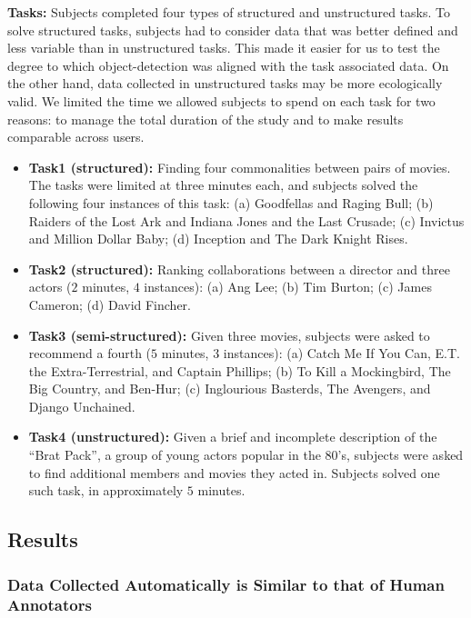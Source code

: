 \noindent\textbf{Tasks:} Subjects completed four types of structured and unstructured tasks. To solve structured tasks, subjects had to consider data that was better defined and less variable than in unstructured tasks. This made it easier for us to test the degree to which object-detection was aligned with the task associated data. On the other hand, data collected in unstructured tasks may be more ecologically valid. We limited the time we allowed subjects to spend on each task for two reasons: to manage the total duration of the study and to make results comparable across users.

\begin{itemize}
\item \textbf{Task1 (structured):} Finding four commonalities between pairs of movies. The tasks were limited at three minutes each, and subjects solved the following four instances of this task: (a) Goodfellas and Raging Bull; (b) Raiders of the Lost Ark and Indiana Jones and the Last Crusade; (c) Invictus and Million Dollar Baby; (d) Inception and The Dark Knight Rises.  
\item \textbf{Task2 (structured):} Ranking collaborations between a director and three actors ($2$ minutes, $4$ instances): (a) Ang Lee; (b) Tim Burton; (c) James Cameron; (d) David Fincher.  
\item \textbf{Task3 (semi-structured):} Given three movies, subjects were asked to recommend a fourth ($5$ minutes, $3$ instances): (a) Catch Me If You Can, E.T. the Extra-Terrestrial, and Captain Phillips; (b) To Kill a Mockingbird, The Big Country, and Ben-Hur; (c) Inglourious Basterds, The Avengers, and Django Unchained.

\item \textbf{Task4 (unstructured):} Given a brief and incomplete description of the ``Brat Pack'', a group of young actors popular in the 80's, subjects were asked to find additional members and movies they acted in. Subjects solved one such task, in approximately $5$ minutes. 
\end{itemize}


\subsection{Results}
\subsubsection{Data Collected Automatically is Similar to that of Human Annotators}
\label{sec:EvalResults}

